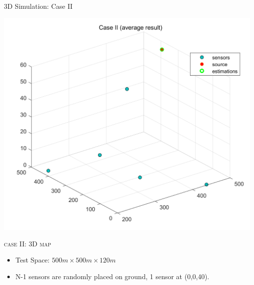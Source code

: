 \documentclass[10pt]{beamer}
\begin{document}
\begin{frame}{3D Simulation: Case II}
  \begin{center}
  \includegraphics[scale = 0.2]{img/case2result.png}
  \end{center}
  \begin{center} \textsc{case II: 3D map} \end{center}
  \begin{itemize}
    \item \small Test Space: $500m\times500m\times120m$
    \item \small N-1 sensors are randomly placed on ground, 1 sensor at (0,0,40).
  \end{itemize}
\end{frame}
\end{document}
